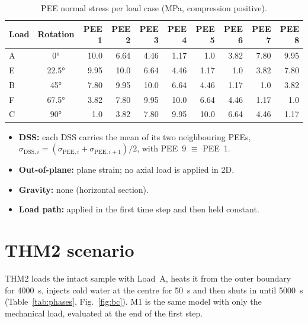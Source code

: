 \documentclass[11pt,a4paper]{article}
\begin{document}
\begin{table}[htbp]
\centering
\caption{PEE normal stress per load case (MPa, compression positive).}
\label{tab:loads}
\begin{tabular}{@{}lc*{8}{r}@{}}
\toprule
Load & Rotation & PEE 1 & PEE 2 & PEE 3 & PEE 4 & PEE 5 & PEE 6 & PEE 7 & PEE 8 \\
\midrule
A & \ang{0}    & 10.0 & 6.64 & 4.46 & 1.17 & 1.0  & 3.82 & 7.80 & 9.95 \\
E & \ang{22.5} & 9.95 & 10.0 & 6.64 & 4.46 & 1.17 & 1.0  & 3.82 & 7.80 \\
B & \ang{45}   & 7.80 & 9.95 & 10.0 & 6.64 & 4.46 & 1.17 & 1.0  & 3.82 \\
F & \ang{67.5} & 3.82 & 7.80 & 9.95 & 10.0 & 6.64 & 4.46 & 1.17 & 1.0  \\
C & \ang{90}   & 1.0  & 3.82 & 7.80 & 9.95 & 10.0 & 6.64 & 4.46 & 1.17 \\
\bottomrule
\end{tabular}
\end{table}

\begin{itemize}
  \item \textbf{DSS:} each DSS carries the mean of its two neighbouring PEEs,
        $\sigma_{\mathrm{DSS},i}=(\sigma_{\mathrm{PEE},i}+\sigma_{\mathrm{PEE},i+1})/2$,
        with PEE~9 $\equiv$ PEE~1.
  \item \textbf{Out-of-plane:} plane strain; no axial load is applied in 2D.
  \item \textbf{Gravity:} none (horizontal section).
  \item \textbf{Load path:} applied in the first time step and then held constant.
\end{itemize}

\section{THM2 scenario}
THM2 loads the intact sample with Load~A, heats it from the outer boundary for
\SI{4000}{s}, injects cold water at the centre for \SI{50}{s} and then shuts in
until \SI{5000}{s} (Table~\ref{tab:phases}, Fig.~\ref{fig:bc}). M1 is the same
model with only the mechanical load, evaluated at the end of the first step.
\end{document}
